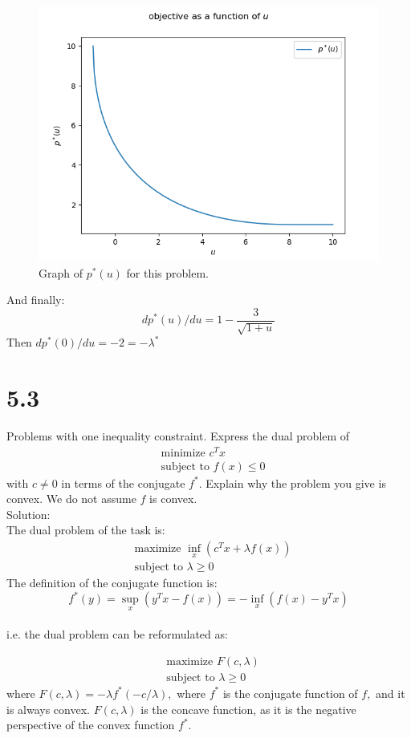 \documentclass{article}
\begin{document}
\begin{figure}[h!]
	\includegraphics[width=\linewidth]{5_1_3.png}
	\caption{Graph of $p^*(u)$ for this problem.}
	\label{fig:5_1_3}
\end{figure}

And finally:
$$dp^*(u) / du = 1 - \frac{3}{\sqrt{1 + u}}$$
Then $dp^*(0) / du = -2 = - \lambda^*$

\section*{5.3}

Problems with one inequality constraint. Express the dual problem of 
\begin{align*}
&\text{minimize }  c^Tx \\
&\text{subject to }  f(x) \leq 0
\end{align*} 
with $c \neq 0$ in terms of the conjugate $f^*.$ Explain why the problem you give is convex. We do not assume $f$ is convex. \\

Solution: \\
The dual problem of the task is:
\begin{align*}
&\text{maximize }  \inf_x (c^Tx + \lambda f(x)) \\
&\text{subject to }  \lambda \geq 0
\end{align*} 
The definition of the conjugate function is:
$$ f^*(y) = \sup_x (y^T x - f(x)) = - \inf_x(f(x) - y^Tx)$$\\
i.e. the dual problem can be reformulated as:

\begin{align*}
&\text{maximize }  F(c, \lambda) \\
&\text{subject to }  \lambda \geq 0
\end{align*} 
where $F(c, \lambda) = - \lambda f^*(-c/\lambda), $
where $f^*$ is the conjugate function of $f,$ and it is always convex.  $F(c, \lambda)$ is the concave function, as it is the negative perspective of the convex function $f^*$.
\end{document}
